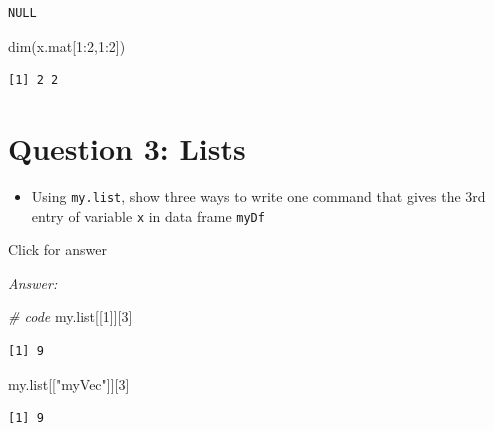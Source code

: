 \documentclass[
]{book}
\newenvironment{Shaded}{\begin{snugshade}}{\end{snugshade}}
\newcommand{\CommentTok}[1]{\textcolor[rgb]{0.56,0.35,0.01}{\textit{#1}}}
\newcommand{\DecValTok}[1]{\textcolor[rgb]{0.00,0.00,0.81}{#1}}
\newcommand{\FunctionTok}[1]{\textcolor[rgb]{0.00,0.00,0.00}{#1}}
\newcommand{\NormalTok}[1]{#1}
\newcommand{\SpecialCharTok}[1]{\textcolor[rgb]{0.00,0.00,0.00}{#1}}
\newcommand{\StringTok}[1]{\textcolor[rgb]{0.31,0.60,0.02}{#1}}
\providecommand{\tightlist}{%
  \setlength{\itemsep}{0pt}\setlength{\parskip}{0pt}}
\begin{document}
\begin{verbatim}
NULL
\end{verbatim}

\begin{Shaded}
\begin{Highlighting}[]
\FunctionTok{dim}\NormalTok{(x.mat[}\DecValTok{1}\SpecialCharTok{:}\DecValTok{2}\NormalTok{,}\DecValTok{1}\SpecialCharTok{:}\DecValTok{2}\NormalTok{])}
\end{Highlighting}
\end{Shaded}

\begin{verbatim}
[1] 2 2
\end{verbatim}

\hypertarget{question-3-lists}{%
\section{Question 3: Lists}\label{question-3-lists}}

\begin{itemize}
\tightlist
\item
  Using \texttt{my.list}, show three ways to write one command that gives the 3rd entry of variable \texttt{x} in data frame \texttt{myDf}
\end{itemize}

Click for answer

\emph{Answer:}

\begin{Shaded}
\begin{Highlighting}[]
\CommentTok{\# code}
\NormalTok{my.list[[}\DecValTok{1}\NormalTok{]][}\DecValTok{3}\NormalTok{]}
\end{Highlighting}
\end{Shaded}

\begin{verbatim}
[1] 9
\end{verbatim}

\begin{Shaded}
\begin{Highlighting}[]
\NormalTok{my.list[[}\StringTok{"myVec"}\NormalTok{]][}\DecValTok{3}\NormalTok{]}
\end{Highlighting}
\end{Shaded}

\begin{verbatim}
[1] 9
\end{verbatim}

\begin{Shaded}
\end{Shaded}
\end{document}
